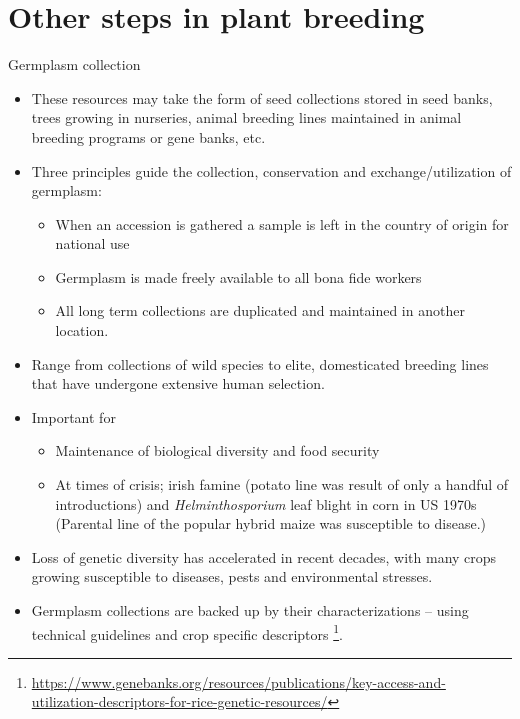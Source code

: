 \documentclass[11pt,ignorenonframetext,aspectratio=169]{beamer}
\providecommand{\tightlist}{%
  \setlength{\itemsep}{0pt}\setlength{\parskip}{0pt}}
\begin{document}
\hypertarget{other-steps-in-plant-breeding}{%
\section{Other steps in plant
breeding}\label{other-steps-in-plant-breeding}}

\begin{frame}{Germplasm collection}
\protect\hypertarget{germplasm-collection}{}
\footnotesize

\begin{itemize}
\tightlist
\item
  These resources may take the form of seed collections stored in seed
  banks, trees growing in nurseries, animal breeding lines maintained in
  animal breeding programs or gene banks, etc.
\item
  Three principles guide the collection, conservation and
  exchange/utilization of germplasm:

  \begin{itemize}
  \tightlist
  \item
    \footnotesize When an accession is gathered a sample is left in the
    country of origin for national use
  \item
    Germplasm is made freely available to all bona fide workers
  \item
    All long term collections are duplicated and maintained in another
    location.
  \end{itemize}
\item
  Range from collections of wild species to elite, domesticated breeding
  lines that have undergone extensive human selection.
\item
  Important for

  \begin{itemize}
  \tightlist
  \item
    \footnotesize Maintenance of biological diversity and food security
  \item
    At times of crisis; irish famine (potato line was result of only a
    handful of introductions) and \emph{Helminthosporium} leaf blight in
    corn in US 1970s (Parental line of the popular hybrid maize was
    susceptible to disease.)
  \end{itemize}
\item
  Loss of genetic diversity has accelerated in recent decades, with many
  crops growing susceptible to diseases, pests and environmental
  stresses.
\item
  Germplasm collections are backed up by their characterizations --
  using technical guidelines and crop specific descriptors
  \footnote[frame]{\url{https://www.genebanks.org/resources/publications/key-access-and-utilization-descriptors-for-rice-genetic-resources/}}.
\end{itemize}
\end{frame}
\end{document}
